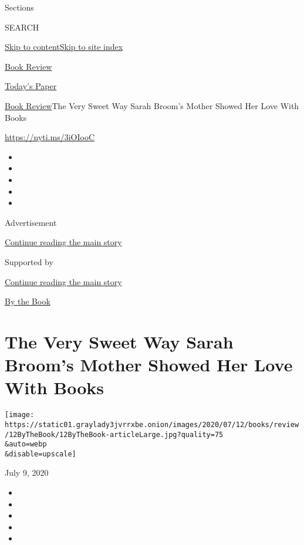 Sections

SEARCH

\protect\hyperlink{site-content}{Skip to
content}\protect\hyperlink{site-index}{Skip to site index}

\href{https://www.nytimes3xbfgragh.onion/section/books/review}{Book
Review}

\href{https://myaccount.nytimes3xbfgragh.onion/auth/login?response_type=cookie\&client_id=vi}{}

\href{https://www.nytimes3xbfgragh.onion/section/todayspaper}{Today's
Paper}

\href{/section/books/review}{Book Review}\textbar{}The Very Sweet Way
Sarah Broom's Mother Showed Her Love With Books

\url{https://nyti.ms/3iOIooC}

\begin{itemize}
\item
\item
\item
\item
\item
\end{itemize}

Advertisement

\protect\hyperlink{after-top}{Continue reading the main story}

Supported by

\protect\hyperlink{after-sponsor}{Continue reading the main story}

\href{/column/by-the-book}{By the Book}

\hypertarget{the-very-sweet-way-sarah-brooms-mother-showed-her-love-with-books}{%
\section{The Very Sweet Way Sarah Broom's Mother Showed Her Love With
Books}\label{the-very-sweet-way-sarah-brooms-mother-showed-her-love-with-books}}

\texttt{[image: https://static01.graylady3jvrrxbe.onion/images/2020/07/12/books/review/12ByTheBook/12ByTheBook-articleLarge.jpg?quality=75\\\&auto=webp\\\&disable=upscale]}

July 9, 2020

\begin{itemize}
\item
\item
\item
\item
\item
\end{itemize}

